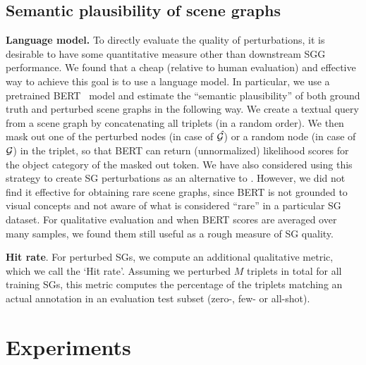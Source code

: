 \subsection{Semantic plausibility of scene graphs\label{sec:sg_quality}}

\textbf{Language model.} To directly evaluate the quality of perturbations, it is desirable to have some quantitative measure other than downstream SGG performance. We found that a cheap (relative to human evaluation) and effective way to achieve this goal is to use a language model. In particular, we use a pretrained BERT~\citep{devlin2018bert} model and estimate the ``semantic plausibility'' of both ground truth and perturbed scene graphs in the following way.
We create a textual query from a scene graph by concatenating all triplets (in a random order). We then mask out one of the perturbed nodes (in case of $\mathit{\hat{\mathit{\cal G}}}$) or a random node (in case of $\mathit{\cal G}$) in the triplet, so that BERT can return (unnormalized) likelihood scores for the object category of the masked out token. 
We have also considered using this strategy to create SG perturbations as an alternative to \structn. However, we did not find it effective for obtaining rare scene graphs, since BERT is not grounded to visual concepts and not aware of what is considered ``rare'' in a particular SG dataset. For qualitative evaluation and when BERT scores are averaged over many samples, we found them still useful as a rough measure of SG quality. 

\textbf{Hit rate}. For perturbed SGs, we compute an additional qualitative metric, which we call the `Hit rate'. Assuming we perturbed $M$ triplets in total for all training SGs, this metric computes the percentage of the triplets matching an actual annotation in an evaluation test subset (zero-, few- or all-shot).


\section{Experiments}
\label{sec:iccv_exper}
\vspace{-3pt}
